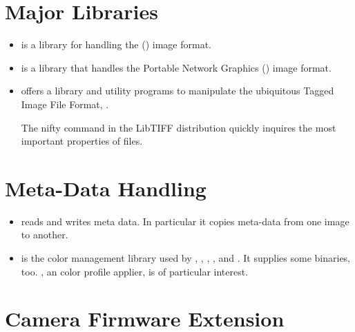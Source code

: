 \section[Libraries]{Major Libraries
  \label{sec:helpful-libraries}
  }

\begin{itemize}
\item\label{lib:jpeg}  is a
  library for handling the  () image
  format.

\item\label{lib:png}  is a
  library that handles the Portable Network Graphics ()
  image format.

\item\label{lib:tiff}
   offers a
  library and utility programs to manipulate the ubiquitous Tagged
  Image File Format, .

  The nifty 
  command in the LibTIFF distribution quickly inquires the most
  important properties of  files.
\end{itemize}


\section[Meta-Data Handling]{Meta-Data Handling
  \label{sec:meta-data-handling}
  }

\begin{itemize}
\item\label{app:exiftool}
   reads
  and writes  meta data.  In particular it copies
  meta-data from one image to another.

\item\label{app:littlecms}
   is the color management library used by
  , , ,
  , and .  It supplies some
  binaries, too.  , an  color profile
  applier, is of particular interest.
\end{itemize}


\section[Camera Firmware Extension]{Camera Firmware Extension
  \label{sec:camera-firmware-extension}
  }

